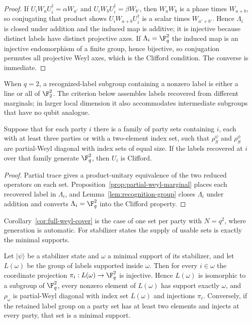 \begin{proof}
If \(U_iW_aU_i^\dagger=\alpha W_{a'}\) and \(U_iW_bU_i^\dagger=\beta W_{b'}\),
then \(W_aW_b\) is a phase times \(W_{a+b}\), so conjugating that product
shows \(U_iW_{a+b}U_i^\dagger\) is a scalar times \(W_{a'+b'}\).  Hence
\(\Lambda_i\) is closed under addition and the induced map is additive; it
is injective because distinct labels have distinct projective axes.  If
\(\Lambda_i=\F_q^2\) the induced map is an injective endomorphism of a
finite group, hence bijective, so conjugation permutes all projective Weyl
axes, which is the Clifford condition.  The converse is immediate.
\end{proof}

When \(q=2\), a recognized-label subgroup containing a nonzero label is either a
line or all of \(\F_2^2\).  The criterion below assembles labels recovered
from different marginals; in larger local dimension it also accommodates
intermediate subgroups that have no qubit analogue.

\begin{corollary}\label{cor:recognition-generation}
Suppose that for each party \(i\) there is a family of party sets
containing \(i\), each with at least three parties or with a two-element
index set, such that \(\rho^\psi_S\) and \(\rho^\phi_S\) are partial-Weyl
diagonal with index sets of equal size.  If the labels recovered at \(i\)
over that family generate \(\F_q^2\), then \(U_i\) is Clifford.
\end{corollary}

\begin{proof}
Partial trace gives a product-unitary equivalence of the two reduced
operators on each set.  Proposition~\ref{prop:partial-weyl-marginal} places
each recovered label in \(\Lambda_i\), and
Lemma~\ref{lem:recognition-group} closes \(\Lambda_i\) under addition and
converts \(\Lambda_i=\F_q^2\) into the Clifford property.
\end{proof}

Corollary~\ref{cor:full-weyl-cover} is the case of one set per party with
\(N=q^2\), where generation is automatic.  For stabilizer states the
supply of usable sets is exactly the minimal supports.

\begin{lemma}
\label{lem:minimal-support-charts}
Let \(\lvert\psi\rangle\) be a stabilizer state and \(\omega\) a minimal
support of its stabilizer, and let \(L(\omega)\) be the group of labels
supported inside \(\omega\).  Then for every \(i\in\omega\) the coordinate
projection \(\pi_i:L(\omega)\to\F_q^2\) is injective.  Hence \(L(\omega)\)
is isomorphic to a subgroup of \(\F_q^2\), every nonzero element of
\(L(\omega)\) has support exactly \(\omega\), and \(\rho_\omega\) is
partial-Weyl diagonal with index set \(L(\omega)\) and injections
\(\pi_i\).  Conversely, if the retained label group on a party set has at
least two elements and injects at every party, that set is a minimal
support.
\end{lemma}

